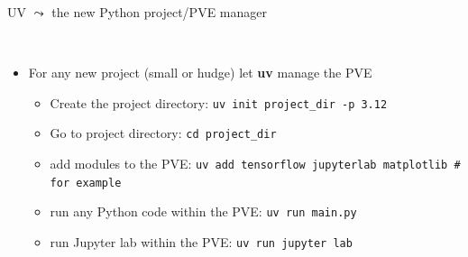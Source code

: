 \documentclass[11pt, serif, mathserif, compress]{beamer}  %
\begin{document}
\begin{frame}[fragile]{UV $\leadsto$ the new Python project/PVE manager}
  
  \begin{bclogo}[noborder=true, couleur=gray!20, couleurBarre=Chocolate, logo=\raisebox{1mm}{\,\huge⚙}, marge=0, margeG=-0.6, margeD=-0.6,]
    {\ }
    \smallskip

    \begin{itemize}\setlength\itemsep{3mm}
    \item<2-> For any new project (small or hudge) let {\bf uv} manage the PVE
      \begin{itemize}\setlength\itemsep{2mm}        
      \item<3-> Create the project directory: \texttt{uv init project_dir -p 3.12}
      \item<4-> Go to project directory: \texttt{cd project_dir}
      \item<5-> add modules to the PVE: \texttt{uv add tensorflow jupyterlab matplotlib  # for example}
      \item<6-> run any Python code within the PVE: \texttt{uv run main.py}
      \item<7-> run Jupyter lab within the PVE: \texttt{uv run jupyter lab}
      \end{itemize}
      
    \end{itemize}
  \end{bclogo}

\end{frame}
\end{document}
